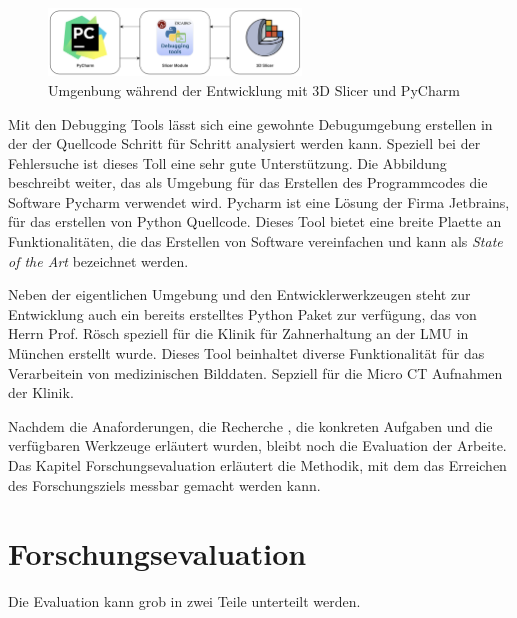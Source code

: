 \begin{figure}[h]
	\centering
	\includegraphics[width=0.6\textwidth]{img/Entwicklungsumgebung.png}
	\caption{Umgenbung während der Entwicklung mit 3D Slicer und PyCharm}
	\label{fig:entwicklungsumgebung}
\end{figure}

Mit den Debugging Tools lässt sich eine gewohnte Debugumgebung erstellen in der der
Quellcode Schritt für Schritt analysiert werden kann. Speziell bei der
Fehlersuche ist dieses Toll eine sehr gute Unterstützung. Die Abbildung beschreibt
weiter, das als Umgebung für das Erstellen des Programmcodes die Software
Pycharm verwendet wird. Pycharm ist eine Lösung der Firma Jetbrains, für das
erstellen von Python Quellcode. Dieses Tool bietet eine breite Plaette an Funktionalitäten,
die das Erstellen von Software vereinfachen und kann als \textit{State of the
Art} bezeichnet werden.

Neben der eigentlichen Umgebung und den Entwicklerwerkzeugen steht zur Entwicklung
auch ein bereits erstelltes Python Paket zur verfügung, das von Herrn Prof. Rösch
speziell für die Klinik für Zahnerhaltung an der LMU in München erstellt wurde.
Dieses Tool beinhaltet diverse Funktionalität für das Verarbeitein von
medizinischen Bilddaten. Sepziell für die Micro CT Aufnahmen der Klinik.

Nachdem die Anaforderungen, die Recherche , die konkreten Aufgaben und die
verfügbaren Werkzeuge erläutert wurden, bleibt noch die Evaluation der Arbeite.
Das Kapitel Forschungsevaluation erläutert die Methodik, mit dem das Erreichen des
Forschungsziels messbar gemacht werden kann.


\section{Forschungsevaluation}
Die Evaluation kann grob in zwei Teile unterteilt werden.
